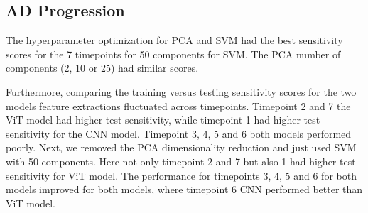    



\subsection{AD Progression}
The hyperparameter optimization for PCA and SVM had the best sensitivity scores for the 7 timepoints for 50 components for SVM. The PCA number of components (2, 10 or 25) had similar scores. 

    

Furthermore, comparing the training versus testing sensitivity scores for the two models feature extractions fluctuated across timepoints. Timepoint 2 and 7 the ViT model had higher test sensitivity, while timepoint 1 had higher test sensitivity for the CNN model. Timepoint 3, 4, 5 and 6 both models performed poorly. Next, we removed the PCA dimensionality reduction and just used SVM with 50 components. Here not only timepoint 2 and 7 but also 1 had higher test sensitivity for ViT model. The performance for timepoints 3, 4, 5 and 6 for both models improved for both models, where timepoint 6 CNN performed better than ViT model.  

